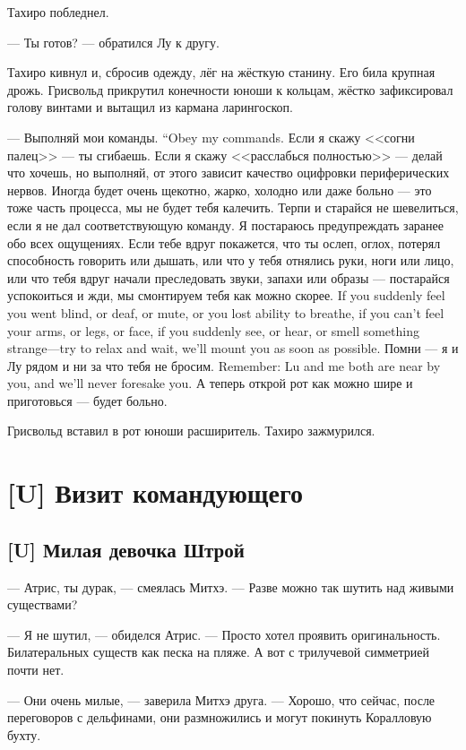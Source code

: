 Тахиро побледнел.

--- Ты готов? --- обратился Лу к другу.

Тахиро кивнул и, сбросив одежду, лёг на жёсткую станину.
Его била крупная дрожь.
Грисвольд прикрутил конечности юноши к кольцам, жёстко зафиксировал голову винтами и вытащил из кармана ларингоскоп.

{--- Выполняй мои команды.}
{``Obey my commands.}
Если я скажу <<согни палец>> --- ты сгибаешь.
Если я скажу <<расслабься полностью>> --- делай что хочешь, но выполняй, от этого зависит качество оцифровки периферических нервов.
Иногда будет очень щекотно, жарко, холодно или даже больно --- это тоже часть процесса, мы не будет тебя калечить.
Терпи и старайся не шевелиться, если я не дал соответствующую команду.
Я постараюсь предупреждать заранее обо всех ощущениях.
{Если тебе вдруг покажется, что ты ослеп, оглох, потерял способность говорить или дышать, или что у тебя отнялись руки, ноги или лицо, или что тебя вдруг начали преследовать звуки, запахи или образы --- постарайся успокоиться и жди, мы смонтируем тебя как можно скорее.}
{If you suddenly feel you went blind, or deaf, or mute, or you lost ability to breathe, if you can't feel your arms, or legs, or face, if you suddenly see, or hear, or smell something strange---try to relax and wait, we'll mount you as soon as possible.}
{Помни --- я и Лу рядом и ни за что тебя не бросим.}
{Remember: Lu and me both are near by you, and we'll never foresake you.}
А теперь открой рот как можно шире и приготовься --- будет больно.

Грисвольд вставил в рот юноши расширитель.
Тахиро зажмурился.

\chapter{[U] Визит командующего}

\section{[U] Милая девочка Штрой}

--- Атрис, ты дурак, --- смеялась Митхэ.
--- Разве можно так шутить над живыми существами?

--- Я не шутил, --- обиделся Атрис.
--- Просто хотел проявить оригинальность.
Билатеральных существ как песка на пляже.
А вот с трилучевой симметрией почти нет.

--- Они очень милые, --- заверила Митхэ друга.
--- Хорошо, что сейчас, после переговоров с дельфинами, они размножились и могут покинуть Коралловую бухту.


